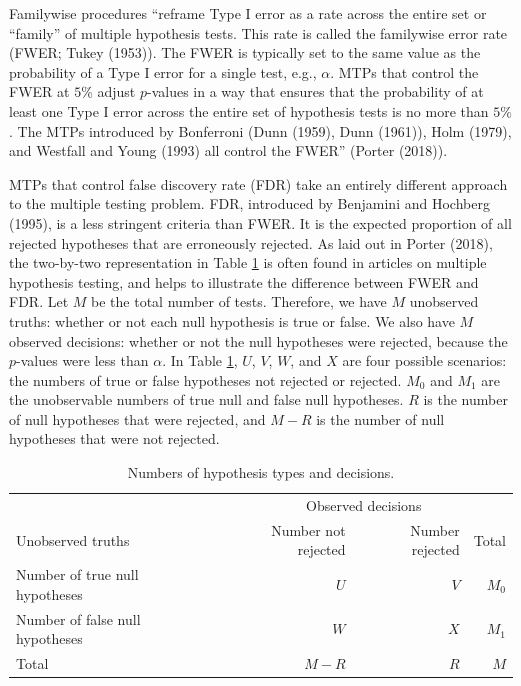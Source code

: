 \documentclass[
]{article}
\begin{document}
Familywise procedures ``reframe Type I error as a rate across the entire
set or ``family'' of multiple hypothesis tests. This rate is called the
familywise error rate (FWER; Tukey (1953)). The FWER is typically set to
the same value as the probability of a Type I error for a single test,
e.g., \(\alpha\). MTPs that control the FWER at \(5\%\) adjust
\(p\)-values in a way that ensures that the probability of at least one
Type I error across the entire set of hypothesis tests is no more than
\(5\%\). The MTPs introduced by Bonferroni (Dunn (1959), Dunn (1961)),
Holm (1979), and Westfall and Young (1993) all control the FWER''
(Porter (2018)).

MTPs that control false discovery rate (FDR) take an entirely different
approach to the multiple testing problem. FDR, introduced by Benjamini
and Hochberg (1995), is a less stringent criteria than FWER. It is the
expected proportion of all rejected hypotheses that are erroneously
rejected. As laid out in Porter (2018), the two-by-two representation in
Table \ref{tab:twobytwo} is often found in articles on multiple
hypothesis testing, and helps to illustrate the difference between FWER
and FDR. Let \(M\) be the total number of tests. Therefore, we have
\(M\) unobserved truths: whether or not each null hypothesis is true or
false. We also have \(M\) observed decisions: whether or not the null
hypotheses were rejected, because the \(p\)-values were less than
\(\alpha\). In Table \ref{tab:twobytwo}, \(U\), \(V\), \(W\), and \(X\)
are four possible scenarios: the numbers of true or false hypotheses not
rejected or rejected. \(M_0\) and \(M_1\) are the unobservable numbers
of true null and false null hypotheses. \(R\) is the number of null
hypotheses that were rejected, and \(M - R\) is the number of null
hypotheses that were not rejected.

\begin{table}[h!]
\centering
\begin{tabular}{l r r r}
\toprule
                                      & \multicolumn{3}{c}{Observed decisions}\\
Unobserved truths                     & Number not rejected     & Number rejected   & Total \\ \midrule
Number of true null hypotheses        & $U$                     & $V$               & $M_0$ \\
Number of false null hypotheses       & $W$                     & $X$               & $M_1$ \\ \hline
Total                                 & $M-R$                   & $R$               & $M$ \\
\bottomrule
\end{tabular}
\caption{Numbers of hypothesis types and decisions.}
  \label{tab:twobytwo}
\end{table}
\end{document}
